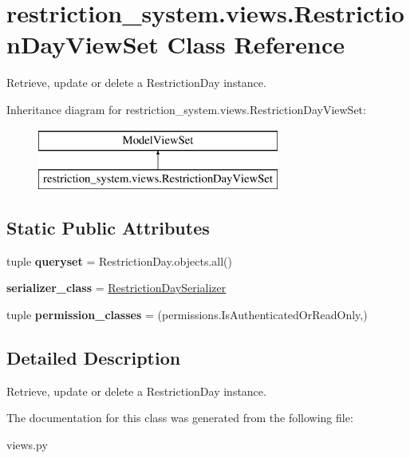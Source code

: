 \hypertarget{classrestriction__system_1_1views_1_1RestrictionDayViewSet}{}\section{restriction\+\_\+system.\+views.\+Restriction\+Day\+View\+Set Class Reference}
\label{classrestriction__system_1_1views_1_1RestrictionDayViewSet}


Retrieve, update or delete a Restriction\+Day instance.  


Inheritance diagram for restriction\+\_\+system.\+views.\+Restriction\+Day\+View\+Set\+:\begin{figure}[H]
\begin{center}
\leavevmode
\includegraphics[height=2.000000cm]{classrestriction__system_1_1views_1_1RestrictionDayViewSet}
\end{center}
\end{figure}
\subsection*{Static Public Attributes}
\begin{DoxyCompactItemize}
\item 
\hypertarget{classrestriction__system_1_1views_1_1RestrictionDayViewSet_ad313e5e40bf19758154cfe22d57f9273}{}tuple {\bfseries queryset} = Restriction\+Day.\+objects.\+all()\label{classrestriction__system_1_1views_1_1RestrictionDayViewSet_ad313e5e40bf19758154cfe22d57f9273}

\item 
\hypertarget{classrestriction__system_1_1views_1_1RestrictionDayViewSet_a7f981bd87969c2c045c3dab7fb517f89}{}{\bfseries serializer\+\_\+class} = \hyperlink{classrestriction__system_1_1serializers_1_1RestrictionDaySerializer}{Restriction\+Day\+Serializer}\label{classrestriction__system_1_1views_1_1RestrictionDayViewSet_a7f981bd87969c2c045c3dab7fb517f89}

\item 
\hypertarget{classrestriction__system_1_1views_1_1RestrictionDayViewSet_abe93f1577e96e8c2b06a9647f69b03a3}{}tuple {\bfseries permission\+\_\+classes} = (permissions.\+Is\+Authenticated\+Or\+Read\+Only,)\label{classrestriction__system_1_1views_1_1RestrictionDayViewSet_abe93f1577e96e8c2b06a9647f69b03a3}

\end{DoxyCompactItemize}


\subsection{Detailed Description}
Retrieve, update or delete a Restriction\+Day instance. 



The documentation for this class was generated from the following file\+:\begin{DoxyCompactItemize}
\item 
views.\+py\end{DoxyCompactItemize}

